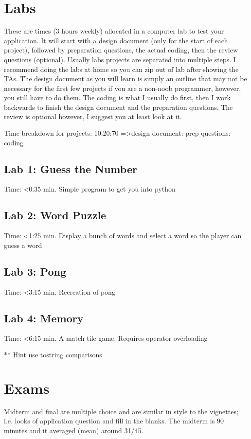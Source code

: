 \documentclass[12pt]{article}
\begin{document}
\section{Labs}
These are times (3 hours weekly) allocated in a computer lab to test your application. It will start with a design document (only for the start of each project), followed by preparation questions, the actual coding, then the review questions (optional). Usually labs projects are separated into multiple steps. I recommend doing the labs at home so you can zip out of lab after showing the TAs. The design document as you will learn is simply an outline that may not be necessary for the first few projects if you are a non-noob programmer, however, you still have to do them. The coding is what I usually do first, then I work backwards to finish the design document and the preparation questions. The review is optional however, I suggest you at least look at it. 

Time breakdown for projects: 10:20:70 =\textgreater design document: prep questions: coding
\subsection{Lab 1: Guess the Number}
Time: \textless 0:35 min.
Simple program to get you into python
\subsection{Lab 2: Word Puzzle}
Time: \textless 1:25 min.
Display a bunch of words and select a word so the player can guess a word
\subsection{Lab 3: Pong}
Time: \textless 3:15 min.
Recreation of pong
\subsection{Lab 4: Memory}
Time: \textless 6:15 min.
A match tile game. Requires operator overloading

** Hint use tostring comparisons

\section{Exams}
Midterm and final are multiple choice and are similar in style to the vignettes; i.e. looks of application question and fill in the blanks. The midterm is 90 minutes and it averaged (mean) around 31/45. 
\end{document}
